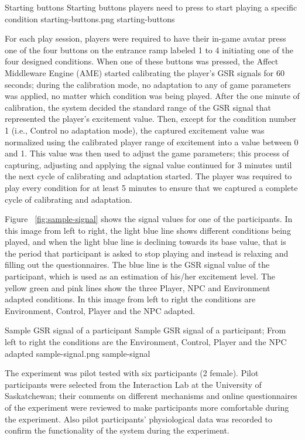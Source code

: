 \largeimg
{Starting buttons}
{Starting buttons players need to press to start playing a specific condition}
{starting-buttons.png}
{starting-buttons}

For each play session, players were required to have their in-game avatar press one of the four buttons on the entrance ramp labeled 1 to 4 initiating one of the four designed conditions. When one of these buttons was pressed, the Affect Middleware Engine (AME) started calibrating the player's GSR signals for 60 seconds; during the calibration mode, no adaptation to any of game parameters was applied, no matter which condition was being played. After the one minute of calibration, the system decided the standard range of the GSR signal that represented the player's excitement value. Then, except for the condition number 1 (i.e., Control no adaptation mode), the captured excitement value was normalized using the calibrated player range of excitement into a value between 0 and 1. This value was then used to adjust the game parameters; this process of capturing, adjusting and applying the signal value continued for 3 minutes until the next cycle of calibrating and adaptation started. The player was required to play every condition for at least 5 minutes to ensure that we captured a complete cycle of calibrating and adaptation.

Figure ~\ref{fig:sample-signal} shows the signal values for one of the participants. In this image from left to right, the light blue line shows different conditions being played, and when the light blue line is declining towards its base value, that is the period that participant is asked to stop playing and instead is relaxing and filling out the questionnaires. The blue line is the GSR signal value of the participant, which is used as an estimation of his/her excitement level. The yellow green and pink lines show the three Player, NPC and Environment adapted conditions. In this image from left to right the conditions are Environment, Control, Player and the NPC adapted.

\largeimg
{Sample GSR signal of a participant}
{Sample GSR signal of a participant; From left to right the conditions are the Environment, Control, Player and the NPC adapted}
{sample-signal.png}
{sample-signal}

The experiment was pilot tested with six participants (2 female). Pilot participants were selected from the Interaction Lab at the University of Saskatchewan; their comments on different mechanisms and online questionnaires of the experiment were reviewed to make participants more comfortable during the experiment. Also pilot participants' physiological data was recorded to confirm the functionality of the system during the experiment.

